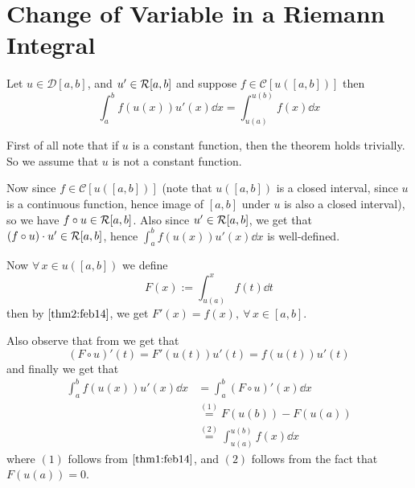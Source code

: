 \section{Change of Variable in a Riemann Integral}

\begin{thm}\label{thm4:feb14}
    Let $u \in \mathcal{D}[a,b]$, and $u' \in \mathcal{R}[a,b]$ and suppose $f \in \mathcal{C}[u([a,b])]$ then 
    \begin{equation}\label{change_of_var}
        \int_a^b f\left(u(x)\right) u'(x) \dd{x} = \int_{u(a)}^{u(b)} f(x) \dd{x}    
    \end{equation}
\end{thm}

\begin{prf}
    First of all note that if $u$ is a constant function, then the theorem holds trivially. So we assume that $u$ is not a constant function. 

    Now since $f \in \mathcal{C}[u([a,b])]$ (note that $u([a,b])$ is a closed interval, since $u$ is a continuous function, hence image of $[a,b]$ under $u$ is also a closed interval), so we have $f \circ u \in \mathcal{R}[a,b]$. Also since $u' \in \mathcal{R}[a,b]$, we get that $(f \circ u) \cdot u' \in \mathcal{R}[a,b]$, hence $\int_a^b f (u(x))u'(x) \dd{x}$ is well-defined.

    Now $\forall \, x \in u([a,b])$ we define 
    \[
        F(x) := \int_{u(a)}^x f(t) \dd{t}  
    \] 
    then by  $\ref{thm2:feb14}$, we get $F'(x) = f(x), \ \forall \, x \in [a,b]$.

    Also observe that from  we get that 
    \[
        \left( F \circ u \right)'(t) = F'(u(t))u'(t) = f(u(t))u'(t)  
    \]
    and finally we get that 
    \begin{align*}
        \int_a^b f(u(x))u'(x) \dd{x} &= \int_a^b \left( F \circ u \right)'(x) \dd{x} \\ 
        &\overset{(1)}{=} F(u(b)) - F(u(a)) \\ 
        &\overset{(2)}{=} \int_{u(a)}^{u(b)} f(x) \dd{x}
    \end{align*}
    where $(1)$ follows from  $\ref{thm1:feb14}$, and $(2)$ follows from the fact that $F(u(a)) = 0$.
\end{prf}
